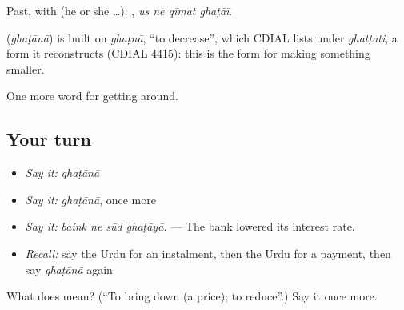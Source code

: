 Past, with  (he or she …):    , \emph{us ne qīmat ghaṭāī}.

\begin{cousinweb}
\textbf{} (\emph{ghaṭānā}) is built on \emph{ghaṭnā}, \textquotedblleft{}to decrease\textquotedblright{}, which CDIAL lists under \emph{ghaṭṭati}, a form it reconstructs (CDIAL 4415): this is the form for making something smaller.
\end{cousinweb}

\begin{grammarlens}[title={What you've built}]
One more word for getting around.
\end{grammarlens}

\subsection*{Your turn}
\begin{itemize}
\raggedright
  \item \emph{Say it:} \emph{ghaṭānā}
  \item \emph{Say it:} \emph{ghaṭānā}, once more
  \item \emph{Say it:} \emph{baink ne sūd ghaṭāyā.} — The bank lowered its interest rate.
  \item \emph{Recall:} say the Urdu for an instalment, then the Urdu for a payment, then say \emph{ghaṭānā} again
\end{itemize}

\begin{tcolorbox}[breakable,colback=teal!4,colframe=teal!35!black,title={Before you move on}]
What does  mean? (\textquotedblleft{}To bring down (a price); to reduce\textquotedblright{}.) Say it once more.
\end{tcolorbox}
